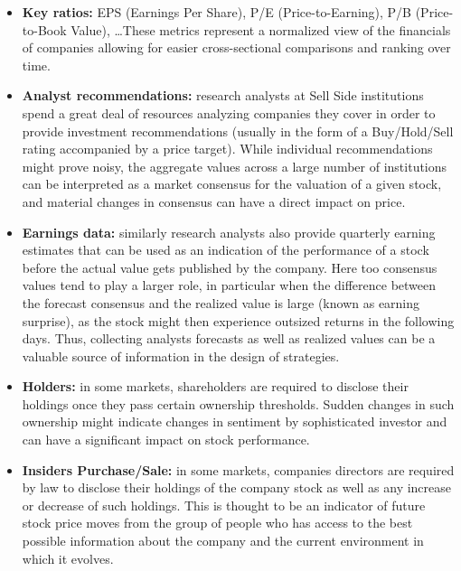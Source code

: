 \begin{itemize}
\item \textbf{Key ratios:} EPS (Earnings Per Share), P/E (Price-to-Earning), P/B (Price-to-Book Value), \dots These metrics represent a normalized view of the financials of companies allowing for easier cross-sectional comparisons and ranking over time.

\item \textbf{Analyst recommendations:} research analysts at Sell Side institutions spend a great deal of resources analyzing companies they cover in order to provide investment recommendations (usually in the form of a Buy/Hold/Sell rating accompanied by a price target). While individual recommendations might prove noisy, the aggregate values across a large number of institutions can be interpreted as a market consensus for the valuation of a given stock, and material changes in consensus can have a direct impact on price.

\item \textbf{Earnings data:} similarly research analysts also provide quarterly earning estimates that can be used as an indication of the performance of a stock before the actual value gets published by the company. Here too consensus values tend to play a larger role, in particular when the difference between the forecast consensus and the realized value is large (known as earning surprise), as the stock might then experience outsized returns in the following days. Thus, collecting analysts forecasts as well as realized values can be a valuable source of information in the design of strategies.

\item \textbf{Holders:}  in some markets, shareholders are required to disclose their holdings once they pass certain ownership thresholds. Sudden changes in such ownership might indicate changes in sentiment by sophisticated investor and can have a significant impact on stock performance.

\item \textbf{Insiders Purchase/Sale:}  in some markets, companies directors are required by law to disclose their holdings of the company stock as well as any increase or decrease of such holdings. This is thought to be an indicator of future stock price moves from the group of people who has access to the best possible information about the company and the current environment in which it evolves.


\end{itemize}
